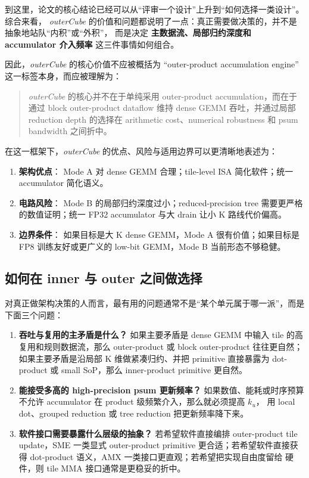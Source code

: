 \documentclass[UTF8,11pt,a4paper]{ctexart}
\newcommand{\ku}{\ensuremath{k_u}}
\newcommand{\modea}{Mode A}
\newcommand{\modeb}{Mode B}
\newcommand{\outercube}{\textit{outerCube}}
\begin{document}
到这里，论文的核心结论已经可以从“评审一个设计”上升到“如何选择一类设计”。综合来看，
\outercube{} 的价值和问题都说明了一点：真正需要做决策的，并不是抽象地站队“内积”或“外积”，
而是决定 \textbf{主数据流、局部归约深度和 accumulator 介入频率} 这三件事情如何组合。

因此，\outercube{} 的核心价值不应被概括为
``outer-product accumulation engine'' 这一标签本身，而应被理解为：

\begin{quote}
  \outercube{} 的核心并不在于单纯采用 outer-product accumulation，而在于通过
  block outer-product dataflow 维持 dense GEMM 吞吐，并通过局部 reduction depth
  的选择在 arithmetic cost、numerical robustness 和 psum bandwidth 之间折中。
\end{quote}

在这一框架下，\outercube{} 的优点、风险与适用边界可以更清晰地表述为：

\begin{enumerate}
  \item \textbf{架构优点}：
  \modea{} 对 dense GEMM 合理；tile-level ISA 简化软件；统一 accumulator 简化语义。
  \item \textbf{电路风险}：
  \modeb{} 的局部归约深度过小；reduced-precision tree 需要更严格的数值证明；统一 FP32
  accumulator 与大 drain 让小 K 路线代价偏高。
  \item \textbf{边界条件}：
  如果目标是大 K dense GEMM，\modea{} 很有价值；如果目标是 FP8 训练友好或更广义的 low-bit
  GEMM，\modeb{} 当前形态不够稳健。
\end{enumerate}

\subsection{如何在 inner 与 outer 之间做选择}

对真正做架构决策的人而言，最有用的问题通常不是“某个单元属于哪一派”，而是下面三个问题：

\begin{enumerate}
  \item \textbf{吞吐与复用的主矛盾是什么？}
  如果主要矛盾是 dense GEMM 中输入 tile 的高复用和规则数据流，那么 outer-product 或
  block outer-product 往往更自然；如果主要矛盾是沿局部 K 维做紧凑归约、并把 primitive
  直接暴露为 dot-product 或 small SoP，那么 inner-product primitive 更自然。
  \item \textbf{能接受多高的 high-precision psum 更新频率？}
  如果数值、能耗或时序预算不允许 accumulator 在 product 级频繁介入，那么就必须提高 \ku{}，
  用 local dot、grouped reduction 或 tree reduction 把更新频率降下来。
  \item \textbf{软件接口需要暴露什么层级的抽象？}
  若希望软件直接编排 outer-product tile update，SME 一类显式 outer-product primitive
  更合适；若希望软件直接获得 dot-product 语义，AMX 一类接口更直观；若希望把实现自由度留给
  硬件，则 tile MMA 接口通常是更稳妥的折中。
\end{enumerate}
\end{document}
